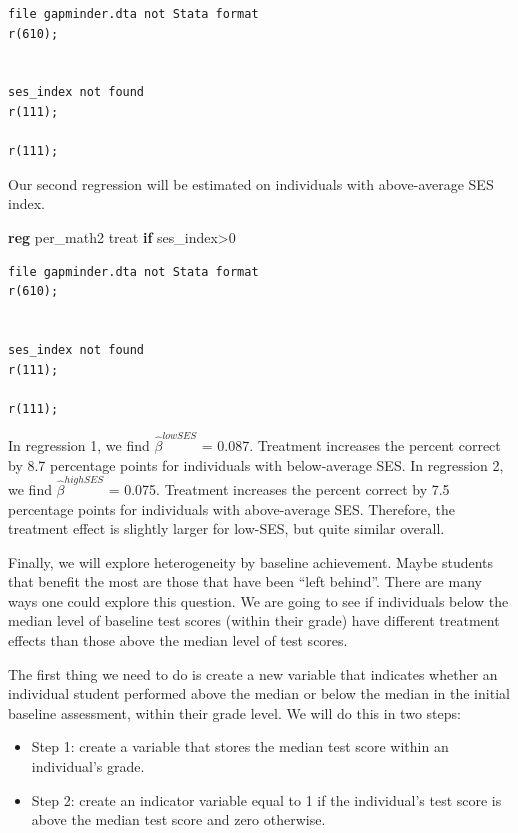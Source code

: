 \documentclass[
]{book}
\newenvironment{Shaded}{\begin{snugshade}}{\end{snugshade}}
\newcommand{\KeywordTok}[1]{\textcolor[rgb]{0.13,0.29,0.53}{\textbf{#1}}}
\newcommand{\NormalTok}[1]{#1}
\begin{document}
\begin{verbatim}
file gapminder.dta not Stata format
r(610);


ses_index not found
r(111);

r(111);
\end{verbatim}

Our second regression will be estimated on individuals with above-average SES index.

\begin{Shaded}
\begin{Highlighting}[]
\KeywordTok{reg}\NormalTok{ per\_math2 treat }\KeywordTok{if}\NormalTok{ ses\_index\textgreater{}0}
\end{Highlighting}
\end{Shaded}

\begin{verbatim}
file gapminder.dta not Stata format
r(610);


ses_index not found
r(111);

r(111);
\end{verbatim}

In regression 1, we find \(\hat{\beta}^{lowSES}\) = 0.087. Treatment increases the percent correct by 8.7 percentage points for individuals with below-average SES. In regression 2, we find \(\hat{\beta}^{highSES}\) = 0.075. Treatment increases the percent correct by 7.5 percentage points for individuals with above-average SES. Therefore, the treatment effect is slightly larger for low-SES, but quite similar overall.

Finally, we will explore heterogeneity by baseline achievement. Maybe students that benefit the most are those that have been ``left behind''. There are many ways one could explore this question. We are going to see if individuals below the median level of baseline test scores (within their grade) have different treatment effects than those above the median level of test scores.

The first thing we need to do is create a new variable that indicates whether an individual student performed above the median or below the median in the initial baseline assessment, within their grade level. We will do this in two steps:

\begin{itemize}
\item
  Step 1: create a variable that stores the median test score within an individual's grade.
\item
  Step 2: create an indicator variable equal to 1 if the individual's test score is above the median test score and zero otherwise.
\end{itemize}
\end{document}
